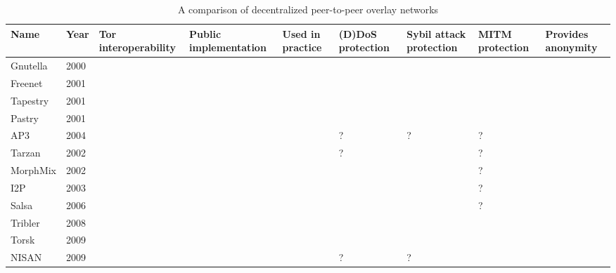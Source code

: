 \begin{center}
    \begin{longtable}{ | p{1.9cm} | p{0.8cm} | p{2.5cm} | p{2.5cm} | p{2.5cm} | p{2.5cm} | p{2.5cm} | p{2.5cm} | p{2.5cm} | }
  		\caption{A comparison of decentralized peer-to-peer overlay networks} \\ \hline
	    \textbf{Name} & \textbf{Year} & \textbf{Tor interoperability} & \textbf{Public implementation} & \textbf{Used in practice} & \textbf{(D)DoS protection} & \textbf{Sybil attack protection} & \textbf{MITM protection} & \textbf{Provides anonymity} \\ \hline
		\endfirsthead
		
		Gnutella & 2000 & \xmark & \checkmark & \checkmark & \xmark & \xmark & \xmark & \xmark \\ \hline
		Freenet & 2001 & \xmark & \checkmark & \checkmark & \checkmark & \xmark & \xmark & \checkmark \\ \hline
		Tapestry & 2001 & \xmark & \checkmark & \checkmark & \checkmark & \xmark & \xmark & \xmark \\ \hline
		Pastry & 2001 & \xmark & \checkmark & \checkmark & \checkmark & \xmark & \xmark & \xmark \\ \hline
		AP3 & 2004 & \xmark & \xmark & \xmark & ? & ? & ? & \checkmark \\ \hline
		Tarzan & 2002 & \xmark & \xmark & \xmark & ? & \checkmark & ? & \checkmark \\ \hline
		MorphMix & 2002 & \xmark & \checkmark & \xmark & \checkmark & \xmark & ? & \checkmark \\ \hline
		I2P & 2003 & \xmark & \checkmark & \checkmark & \checkmark & \checkmark & ? & \checkmark\\ \hline
		Salsa & 2006 & \xmark & \xmark & \xmark & \checkmark & \checkmark & ? & \checkmark \\ \hline
		Tribler & 2008 & \xmark & \checkmark & \checkmark & \checkmark & \xmark & \xmark & \xmark \\ \hline
		Torsk & 2009 & \checkmark & \xmark & \xmark & \checkmark & \checkmark & \checkmark & \checkmark \\ \hline
		NISAN & 2009 & \xmark & \xmark & \xmark & ? & ? & \checkmark & \checkmark \\ \hline
    \end{longtable}
\end{center}